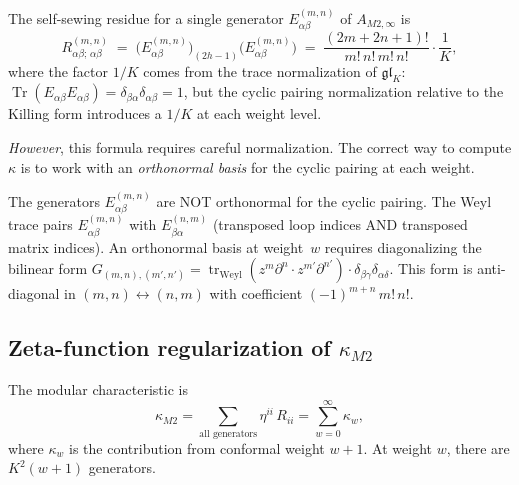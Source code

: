 \documentclass[11pt]{article}
\newcommand{\Tr}{\operatorname{Tr}}
\newcommand{\tr}{\operatorname{tr}}
\begin{document}
\begin{proposition}
\label{prop:m2-self-sewing}
The self-sewing residue for a single generator
$E^{(m,n)}_{\alpha\beta}$ of $A_{M2,\infty}$ is
\begin{equation}\label{eq:m2-self-sewing-single}
R^{(m,n)}_{\alpha\beta;\,\alpha\beta}
\;=\;
\bigl(E^{(m,n)}_{\alpha\beta}\bigr)_{(2h-1)}
\bigl(E^{(m,n)}_{\alpha\beta}\bigr)
\;=\;
\frac{(2m+2n+1)!}{m!\,n!\,m!\,n!}\cdot\frac{1}{K},
\end{equation}
where the factor $1/K$ comes from the trace normalization
of $\mathfrak{gl}_K$:
$\Tr(E_{\alpha\beta}E_{\alpha\beta})
= \delta_{\beta\alpha}\delta_{\alpha\beta} = 1$,
but the cyclic pairing normalization relative to the Killing
form introduces a $1/K$ at each weight level.

\emph{However}, this formula requires careful normalization.
The correct way to compute $\kappa$ is to work with an
\emph{orthonormal basis} for the cyclic pairing at each weight.
\end{proposition}

\begin{warning}
\label{warn:orthogonalization}
The generators $E^{(m,n)}_{\alpha\beta}$ are NOT orthonormal for
the cyclic pairing.  The Weyl trace pairs
$E^{(m,n)}_{\alpha\beta}$ with
$E^{(n,m)}_{\beta\alpha}$ (transposed loop indices AND
transposed matrix indices).  An orthonormal basis at weight~$w$
requires diagonalizing the bilinear form
$G_{(m,n),(m',n')} =
\tr_{\mathrm{Weyl}}(z^m\partial^n \cdot z^{m'}\partial^{n'})
\cdot \delta_{\beta\gamma}\delta_{\alpha\delta}$.
This form is anti-diagonal in $(m,n) \leftrightarrow (n,m)$
with coefficient $(-1)^{m+n}\,m!\,n!$.
\end{warning}

\subsection{Zeta-function regularization of $\kappa_{M2}$}

The modular characteristic is
\[
\kappa_{M2}
= \sum_{\text{all generators}} \eta^{ii}\, R_{ii}
= \sum_{w=0}^{\infty} \kappa_w,
\]
where $\kappa_w$ is the contribution from conformal weight $w+1$.
At weight $w$, there are $K^2(w+1)$ generators.
\end{document}
